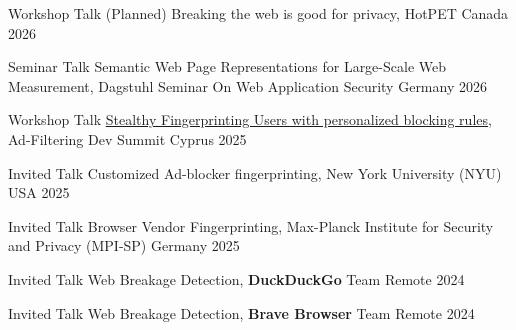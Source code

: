 
\begin{cvhonors}


  \cvhonor
  {Workshop Talk} %
  {(Planned) Breaking the web is good for privacy, HotPET } %
  {Canada} %
  {2026} %

  \cvhonor
  {Seminar Talk} %
  {Semantic Web Page Representations for Large-Scale Web Measurement, Dagstuhl Seminar On Web Application Security  } %
  {Germany} %
  {2026} %

  \cvhonor
  {Workshop Talk} %
  {\href{https://www.youtube.com/watch?v=vEHYKxPq7yE}{Stealthy Fingerprinting Users with personalized blocking rules}, Ad-Filtering Dev Summit} %
  {Cyprus} %
  {2025} %

  \cvhonor
  {Invited Talk}
  {Customized Ad-blocker fingerprinting,  New York University (NYU)}
  {USA}
  {2025}

  \cvhonor
  {Invited Talk}
  {Browser Vendor Fingerprinting, Max-Planck Institute for Security and Privacy (MPI-SP)}
  {Germany}
  {2025}

  \cvhonor
  {Invited Talk}
  {Web Breakage Detection, \textbf{DuckDuckGo} Team}
  {Remote}
  {2024}

  \cvhonor
  {Invited Talk}
  {Web Breakage Detection, \textbf{Brave Browser} Team}
  {Remote}
  {2024}

\end{cvhonors}
